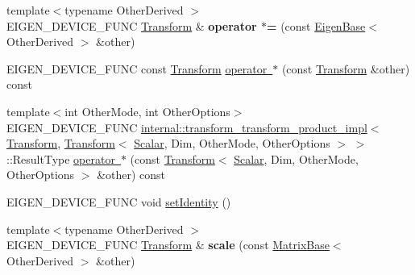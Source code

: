 \begin{DoxyCompactItemize}
\item 
\mbox{\label{class_eigen_1_1_transform_ac339630179dcd3b479675b6d64754060}} 
{\footnotesize template$<$typename Other\+Derived $>$ }\\E\+I\+G\+E\+N\+\_\+\+D\+E\+V\+I\+C\+E\+\_\+\+F\+U\+NC \mbox{\hyperlink{class_eigen_1_1_transform}{Transform}} \& {\bfseries operator $\ast$=} (const \mbox{\hyperlink{struct_eigen_1_1_eigen_base}{Eigen\+Base}}$<$ Other\+Derived $>$ \&other)
\item 
E\+I\+G\+E\+N\+\_\+\+D\+E\+V\+I\+C\+E\+\_\+\+F\+U\+NC const \mbox{\hyperlink{class_eigen_1_1_transform}{Transform}} \mbox{\hyperlink{class_eigen_1_1_transform_a3644f8912216331c3aba1a73cb519a03}{operator $\ast$}} (const \mbox{\hyperlink{class_eigen_1_1_transform}{Transform}} \&other) const
\item 
{\footnotesize template$<$int Other\+Mode, int Other\+Options$>$ }\\E\+I\+G\+E\+N\+\_\+\+D\+E\+V\+I\+C\+E\+\_\+\+F\+U\+NC \mbox{\hyperlink{struct_eigen_1_1internal_1_1transform__transform__product__impl}{internal\+::transform\+\_\+transform\+\_\+product\+\_\+impl}}$<$ \mbox{\hyperlink{class_eigen_1_1_transform}{Transform}}, \mbox{\hyperlink{class_eigen_1_1_transform}{Transform}}$<$ \mbox{\hyperlink{class_eigen_1_1_transform_a4e69ced9d651745b8ed4eda46f41795d}{Scalar}}, Dim, Other\+Mode, Other\+Options $>$ $>$\+::Result\+Type \mbox{\hyperlink{class_eigen_1_1_transform_ad03b12c8d84f5f0a408d1105ce880efd}{operator $\ast$}} (const \mbox{\hyperlink{class_eigen_1_1_transform}{Transform}}$<$ \mbox{\hyperlink{class_eigen_1_1_transform_a4e69ced9d651745b8ed4eda46f41795d}{Scalar}}, Dim, Other\+Mode, Other\+Options $>$ \&other) const
\item 
E\+I\+G\+E\+N\+\_\+\+D\+E\+V\+I\+C\+E\+\_\+\+F\+U\+NC void \mbox{\hyperlink{class_eigen_1_1_transform_a4f0c6b74994904b56b621cf3d9ac4a0f}{set\+Identity}} ()
\item 
\mbox{\label{class_eigen_1_1_transform_a45bd310e475c718d827e831099952172}} 
{\footnotesize template$<$typename Other\+Derived $>$ }\\E\+I\+G\+E\+N\+\_\+\+D\+E\+V\+I\+C\+E\+\_\+\+F\+U\+NC \mbox{\hyperlink{class_eigen_1_1_transform}{Transform}} \& {\bfseries scale} (const \mbox{\hyperlink{class_eigen_1_1_matrix_base}{Matrix\+Base}}$<$ Other\+Derived $>$ \&other)
\item 
\mbox{\label{class_eigen_1_1_transform_a0ae85837c51fff223de66dd78f198447}} 

\end{DoxyCompactItemize}
